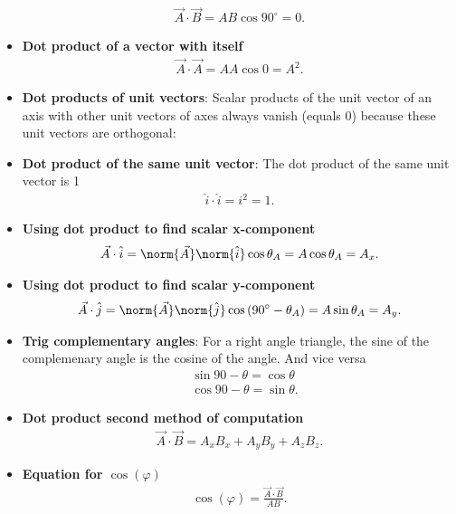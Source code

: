 \documentclass{report}
\begin{document}
\begin{itemize}
\begin{align*}
            \vec{A} \cdot \vec{B} = AB\cos{90^{\circ}} =  0
        .\end{align*}
    \item \textbf{Dot product of a vector with itself}
        \begin{align*}
            \vec{A} \cdot \vec{A} = AA\cos{0} = A^{2}
        .\end{align*}
    \item \textbf{Dot products of unit vectors}: Scalar products of the unit vector of an axis with other unit vectors of axes always vanish (equals 0) because these unit vectors are orthogonal:
    \item \textbf{Dot product of the same unit vector}: The dot product of the same unit vector is 1
        \begin{align*}
            \hat{i} \cdot \hat{i} = i^{2} = 1
        .\end{align*}
    \item \textbf{Using dot product to find scalar x-component}
        \begin{align*}
            \vec{A} \cdot \hat{i} = \norm{\vec{A}} \norm{\hat{i}}\cos{\theta_{A}} = A\cos{\theta_{A}}= A_{x}
        .\end{align*}
    \item \textbf{Using dot product to find scalar y-component}
        \begin{align*}
            \vec{A} \cdot \hat{j} = \norm{\vec{A}} \norm{\hat{j}}\cos{(90^{\circ} -\theta_{A})}= A\sin{\theta_{A}} = A_{y}
        .\end{align*}
    \item \textbf{Trig complementary angles}: For a right angle triangle, the sine of the complemenary angle is the cosine of the angle. And vice versa
        \begin{align*}
            &\sin{90-\theta} = \cos{\theta} \\
            &\cos{90-\theta} = \sin{\theta}
        .\end{align*}
    \item \textbf{Dot product second method of computation}
        \begin{align*}
            \vec{A} \cdot \vec{B} = A_{x}B_{x} + A_{y}B_{y} + A_{z}B_{z}
        .\end{align*}
    \item \textbf{Equation for $\cos{(\varphi)}$}
        \begin{align*}
            \cos{(\varphi)} = \frac{\vec{A} \cdot \vec{B}}{AB}
        .\end{align*}

\end{itemize}
\end{document}
